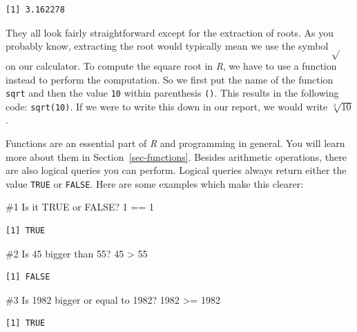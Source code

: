 \documentclass[
  letterpaper,
]{krantz}
\makeatletter
\newenvironment{Shaded}{\begin{snugshade}}{\end{snugshade}}
\newcommand{\CommentTok}[1]{\textcolor[rgb]{0.37,0.37,0.37}{#1}}
\newcommand{\DecValTok}[1]{\textcolor[rgb]{0.68,0.00,0.00}{#1}}
\newcommand{\SpecialCharTok}[1]{\textcolor[rgb]{0.37,0.37,0.37}{#1}}
\newenvironment{kframe}{%
\medskip{}
\setlength{\fboxsep}{.8em}
 \def\at@end@of@kframe{}%
 \ifinner\ifhmode%
  \def\at@end@of@kframe{\end{minipage}}%
  \begin{minipage}{\columnwidth}%
 \fi\fi%
 \def\FrameCommand##1{\hskip\@totalleftmargin \hskip-\fboxsep
 \colorbox{shadecolor}{##1}\hskip-\fboxsep
     \hskip-\linewidth \hskip-\@totalleftmargin \hskip\columnwidth}%
 \MakeFramed {\advance\hsize-\width
   \@totalleftmargin\z@ \linewidth\hsize
   \@setminipage}}%
 {\par\unskip\endMakeFramed%
 \at@end@of@kframe}
\renewenvironment{Shaded}{\begin{kframe}}{\end{kframe}}
\makeatother
\begin{document}
\begin{verbatim}
[1] 3.162278
\end{verbatim}

They all look fairly straightforward except for the extraction of roots.
As you probably know, extracting the root would typically mean we use
the symbol \(\sqrt{}\) on our calculator. To compute the square root in
\emph{R}, we have to use a function instead to perform the computation.
So we first put the name of the function \texttt{sqrt} and then the
value \texttt{10} within parenthesis \texttt{()}. This results in the
following code: \texttt{sqrt(10)}. If we were to write this down in our
report, we would write \(\sqrt[2]{10}\).

Functions are an essential part of \emph{R} and programming in general.
You will learn more about them in Section~\ref{sec-functions}. Besides
arithmetic operations, there are also logical queries you can perform.
Logical queries always return either the value \texttt{TRUE} or
\texttt{FALSE}. Here are some examples which make this clearer:

\begin{Shaded}
\begin{Highlighting}[]
\CommentTok{\#1 Is it TRUE or FALSE?}
\DecValTok{1} \SpecialCharTok{==} \DecValTok{1}
\end{Highlighting}
\end{Shaded}

\begin{verbatim}
[1] TRUE
\end{verbatim}

\begin{Shaded}
\begin{Highlighting}[]
\CommentTok{\#2 Is 45 bigger than 55?}
\DecValTok{45} \SpecialCharTok{\textgreater{}} \DecValTok{55}
\end{Highlighting}
\end{Shaded}

\begin{verbatim}
[1] FALSE
\end{verbatim}

\begin{Shaded}
\begin{Highlighting}[]
\CommentTok{\#3 Is 1982 bigger or equal to 1982?}
\DecValTok{1982} \SpecialCharTok{\textgreater{}=} \DecValTok{1982}
\end{Highlighting}
\end{Shaded}

\begin{verbatim}
[1] TRUE
\end{verbatim}
\end{document}
